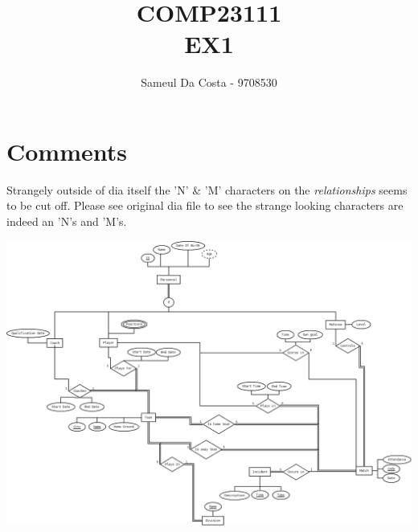 \documentclass{article}
\title{COMP23111 \\ EX1}
\author{Sameul Da Costa - 9708530}
\begin{document}
\maketitle
\newpage


\section{Comments}
Strangely outside of dia itself the 'N' \& 'M' characters on the \emph{relationships} seems to be cut off. Please see original dia file to see the strange looking characters are indeed an 'N's and 'M's.
\newpage
{}

\includegraphics[angle=-90, scale=0.455]{EX1-9708530.png}
\end{document}
